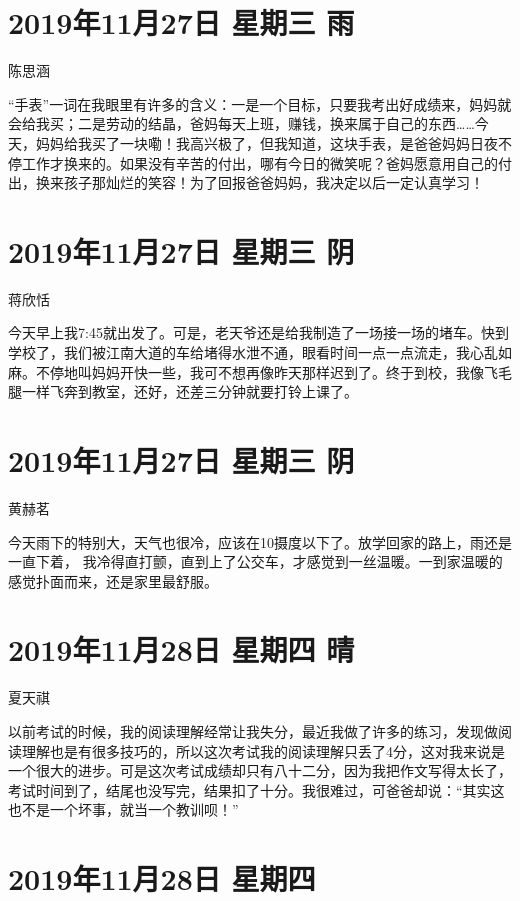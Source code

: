 \section{2019年11月27日 星期三 雨}

陈思涵

``手表''一词在我眼里有许多的含义：一是一个目标，只要我考出好成绩来，妈妈就会给我买；二是劳动的结晶，爸妈每天上班，赚钱，换来属于自己的东西\ldots\ldots 今天，妈妈给我买了一块嘞！我高兴极了，但我知道，这块手表，是爸爸妈妈日夜不停工作才换来的。如果没有辛苦的付出，哪有今日的微笑呢？爸妈愿意用自己的付出，换来孩子那灿烂的笑容！为了回报爸爸妈妈，我决定以后一定认真学习！

\section{2019年11月27日 星期三 阴}

蒋欣恬

今天早上我7:45就出发了。可是，老天爷还是给我制造了一场接一场的堵车。快到学校了，我们被江南大道的车给堵得水泄不通，眼看时间一点一点流走，我心乱如麻。不停地叫妈妈开快一些，我可不想再像昨天那样迟到了。终于到校，我像飞毛腿一样飞奔到教室，还好，还差三分钟就要打铃上课了。

\section{2019年11月27日 星期三 阴}

黄赫茗

今天雨下的特别大，天气也很冷，应该在10摄度以下了。放学回家的路上，雨还是一直下着，
我冷得直打颤，直到上了公交车，才感觉到一丝温暖。一到家温暖的感觉扑面而来，还是家里最舒服。

\section{2019年11月28日 星期四 晴}

夏天祺

以前考试的时候，我的阅读理解经常让我失分，最近我做了许多的练习，发现做阅读理解也是有很多技巧的，所以这次考试我的阅读理解只丢了4分，这对我来说是一个很大的进步。可是这次考试成绩却只有八十二分，因为我把作文写得太长了，考试时间到了，结尾也没写完，结果扣了十分。我很难过，可爸爸却说：``其实这也不是一个坏事，就当一个教训呗！''

\section{2019年11月28日 星期四}

